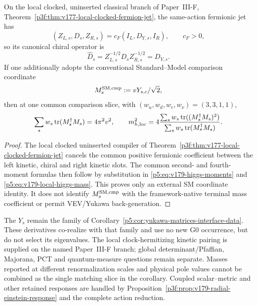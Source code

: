 \documentclass[12pt,a4paper]{article}
\begin{document}
\begin{corollary}
\label{p5:cor:v179-canonical-fermion-comparison}
On the local clocked, uninserted classical branch of
Paper~III-F, Theorem~\ref{p3f:thm:v177-local-clocked-fermion-jet}, the
same-action fermionic jet has
\[
 (Z_{L,s},D_s,Z_{R,s})=c_F(I_L,D_{Y,s},I_R),
 \qquad c_F>0,
\]
so its canonical chiral operator is
\[
 \boxed{\widehat D_s=Z_{L,s}^{-1/2}D_sZ_{R,s}^{-1/2}=D_{Y,s}.}
\]
If one additionally adopts the conventional Standard--Model comparison
coordinate
\[
 M_s^{\rm SM,cmp}:=vY_{s,c}/\sqrt2,
\]
then at one common comparison slice, with
\((w_u,w_d,w_e,w_\nu)=(3,3,1,1)\),
\[
 \sum_s w_s\operatorname{tr}(M_s^\dagger M_s)=4\pi^2v^2,\qquad
 m_{h,\rm loc}^2
 =4\frac{\sum_s w_s\operatorname{tr}((M_s^\dagger M_s)^2)}
          {\sum_s w_s\operatorname{tr}(M_s^\dagger M_s)} .
\]
\end{corollary}
\begin{proof}
The local clocked uninserted compiler of
Theorem~\ref{p3f:thm:v177-local-clocked-fermion-jet} cancels the common
positive fermionic coefficient between the left kinetic, chiral and right
kinetic slots.  The common second- and fourth-moment formulas then follow by substitution
in \eqref{p5:eq:v179-higgs-moments} and
\eqref{p5:eq:v179-local-higgs-mass}.  This proves only an external SM
coordinate identity.  It does not identify $M_s^{\rm SM,cmp}$ with the
framework-native terminal mass coefficient or permit VEV/Yukawa back-generation.
\end{proof}

The \(Y_s\) remain the family of
Corollary~\ref{p5:cor:yukawa-matrices-interface-data}.  These derivatives
co-realize with that family and use no new G0 occurrence, but do not select
its eigenvalues.  The local clock-hermitizing kinetic pairing is supplied on
the named Paper~III-F branch; global determinant/Pfaffian, Majorana, PCT and
quantum-measure questions remain separate.  Masses reported at different
renormalization scales and physical pole values cannot be combined as the
single matching slice in the corollary.  Coupled scalar--metric and other
retained responses are handled by
Proposition~\ref{p3f:prop:v179-radial-einstein-response} and the complete
action reduction.
\end{document}
